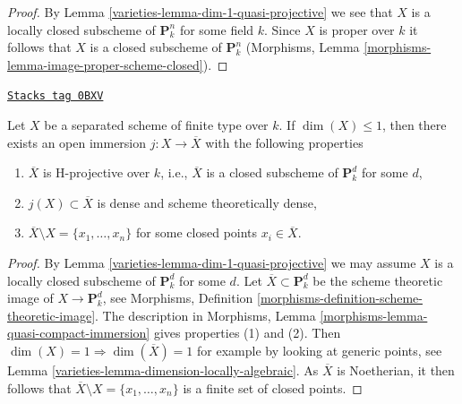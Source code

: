 \begin{proof}

By Lemma \ref{varieties-lemma-dim-1-quasi-projective} we see that $X$ is a
locally closed subscheme of $\mathbf{P}^n_k$ for some field $k$.
Since $X$ is proper over $k$ it follows that $X$ is a closed subscheme
of $\mathbf{P}^n_k$
(Morphisms, Lemma \ref{morphisms-lemma-image-proper-scheme-closed}).
\end{proof}

\begin{lemma}
\label{varieties-lemma-dim-1-projective-completion}
\href{https://stacks.math.columbia.edu/tag/0BXV}{\texttt{Stacks tag 0BXV}}

Let $X$ be a separated scheme of finite type over $k$.
If $\dim(X) \leq 1$, then there exists an open immersion
$j : X \to \overline{X}$ with the following properties
\begin{enumerate}
\item $\overline{X}$ is H-projective over $k$, i.e., $\overline{X}$
is a closed subscheme of $\mathbf{P}^d_k$ for some $d$,
\item $j(X) \subset \overline{X}$ is dense and scheme
theoretically dense,
\item $\overline{X} \setminus X = \{x_1, \ldots, x_n\}$
for some closed points $x_i \in \overline{X}$.
\end{enumerate}
\end{lemma}

\begin{proof}

By Lemma \ref{varieties-lemma-dim-1-quasi-projective} we may assume $X$ is a
locally closed subscheme of $\mathbf{P}^d_k$ for some $d$. Let
$\overline{X} \subset \mathbf{P}^d_k$ be the scheme theoretic image
of $X \to \mathbf{P}^d_k$, see Morphisms, Definition
\ref{morphisms-definition-scheme-theoretic-image}.
The description in
Morphisms, Lemma \ref{morphisms-lemma-quasi-compact-immersion}
gives properties (1) and (2).
Then $\dim(X) = 1 \Rightarrow \dim(\overline{X}) = 1$ for example by
looking at generic points, see
Lemma \ref{varieties-lemma-dimension-locally-algebraic}.
As $\overline{X}$ is Noetherian, it then
follows that $\overline{X} \setminus X = \{x_1, \ldots, x_n\}$
is a finite set of closed points.
\end{proof}

